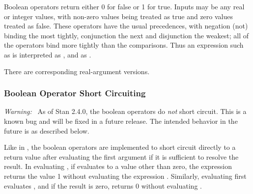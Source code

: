 Boolean operators return either 0 for false or 1 for true.  Inputs may
be any real or integer values, with non-zero values being treated as
true and zero values treated as false.  These operators have the usual
precedences, with negation (not) binding the most tightly, conjunction
the next and disjunction the weakest; all of the operators bind more
tightly than the comparisons.  Thus an expression such as
 is interpreted as , and
 as
.
%
\begin{description}
\end{description}
%
There are corresponding real-argument versions.
%
\begin{description}
\end{description}


\subsubsection{Boolean Operator Short Circuiting}

{\it Warning:} \ As of Stan 2.4.0, the boolean operators do {\it not}
short circuit.  This is a known bug and will be fixed in a future
release.  The intended behavior in the future is as described below.

Like in \Cpp, the boolean operators are implemented to short circuit
directly to a return value after evaluating the first argument if it
is sufficient to resolve the result.  In evaluating , if
 evaluates to a value other than zero, the expression returns
the value 1 without evaluating the expression .  Similarly,
evaluating  first evaluates , and if the result
is zero, returns 0 without evaluating .





